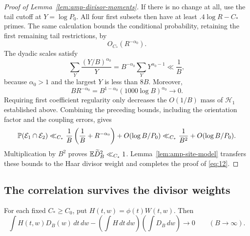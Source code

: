 \begin{proof}[Proof of Lemma~\ref{lem:amp-divisor-moments}]
If there is no change at all, use the tail cutoff at
$Y=\log P_0$.  All four first subsets then have at least
$.4\log R-C_*$ primes.  The same calculation bounds the
conditional probability, retaining the first remaining tail
restrictions, by
\[
 O_{C_*}(R^{-\alpha_0}).
\]
The dyadic scales satisfy
\[
 \sum_Y\frac{(Y/B)^{\alpha_0}}Y
 =B^{-\alpha_0}\sum_Y Y^{\alpha_0-1}
 \ll \frac1B,
\]
because $\alpha_0>1$ and the largest $Y$ is less than $8B$.
Moreover,
\[
 B R^{-\alpha_0}
 = B^{1-\alpha_0}(1000\log B)^{\alpha_0}\longrightarrow0.
\]
Requiring first coefficient regularity only decreases the
$O(1/B)$ mass of $\mathcal H_1$ established above. Combining the preceding bounds,
including the orientation factor and the coupling errors,
gives
\[
 \mathbb P(\mathcal E_1\cap\mathcal E_2)
 \ll_{C_*}\frac1B\left(\frac1B+R^{-\alpha_0}\right)
      +O(\log B/P_0)
 \ll_{C_*}\frac1{B^2}+O(\log B/P_0).
\]
Multiplication by $B^2$ proves
$\mathbb E\widetilde D_B^2\ll_{C_*}1$. Lemma~\ref{lem:amp-site-model} transfers
these bounds to the Haar divisor weight and completes the proof of
\eqref{eq:12}.
\end{proof}

\subsection{The correlation survives the divisor weights}

\begin{lemma}\label{lem:preservation}
For each fixed $C_*\ge C_0$, put $H(t,w)=\phi(t)W(t,w)$.  Then
\begin{equation}\label{eq:amp-preservation}
 \int H(t,w)D_B(w)\,dt\,dw
 -\left(\int H\,dt\,dw\right)\left(\int D_B\,dw\right)
 \longrightarrow0\qquad(B\to\infty).
\end{equation}
\end{lemma}

